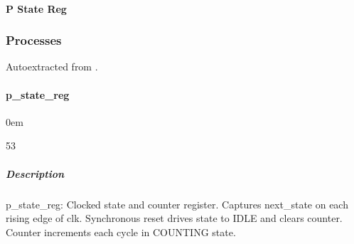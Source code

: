 \documentclass[letterpaper,10pt,english]{sphinxmanual}
\begin{document}
\paragraph{P State Reg}
\label{\detokenize{modules/pwm_controller/timing:p-state-reg}}
\noindent{}

\sphinxstepscope


\subsubsection{Processes}
\label{\detokenize{modules/pwm_controller/processes/index:processes}}\label{\detokenize{modules/pwm_controller/processes/index::doc}}
\sphinxAtStartPar
Auto\sphinxhyphen{}extracted from .

\sphinxstepscope


\paragraph{p\_state\_reg}
\label{\detokenize{modules/pwm_controller/processes/p_state_reg:p-state-reg}}\label{\detokenize{modules/pwm_controller/processes/p_state_reg::doc}}
\begin{DUlineblock}{0em}
\item[]  
\item[]  53
\item[]  
\item[]  
\end{DUlineblock}


\subparagraph{Description}
\label{\detokenize{modules/pwm_controller/processes/p_state_reg:description}}
\sphinxAtStartPar
p\_state\_reg: Clocked state and counter register.
Captures next\_state on each rising edge of clk.
Synchronous reset drives state to IDLE and clears counter.
Counter increments each cycle in COUNTING state.

\noindent{}
\end{document}
